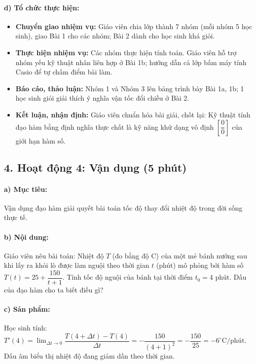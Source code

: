 \documentclass[12pt, a4paper]{article}
\begin{document}
\paragraph{d) Tổ chức thực hiện:}
\begin{itemize}[leftmargin=0.8cm]
    \item \textbf{Chuyển giao nhiệm vụ:} Giáo viên chia lớp thành 7 nhóm (mỗi nhóm 5 học sinh), giao Bài 1 cho các nhóm; Bài 2 dành cho học sinh khá giỏi.
    \item \textbf{Thực hiện nhiệm vụ:} Các nhóm thực hiện tính toán. Giáo viên hỗ trợ nhóm yếu kỹ thuật nhân liên hợp ở Bài 1b; hướng dẫn cả lớp bấm máy tính Casio để tự chấm điểm bài làm.
    \item \textbf{Báo cáo, thảo luận:} Nhóm 1 và Nhóm 3 lên bảng trình bày Bài 1a, 1b; 1 học sinh giỏi giải thích ý nghĩa vận tốc đổi chiều ở Bài 2.
    \item \textbf{Kết luận, nhận định:} Giáo viên chuẩn hóa bài giải, chốt lại: Kỹ thuật tính đạo hàm bằng định nghĩa thực chất là kỹ năng khử dạng vô định $\left[\dfrac{0}{0}\right]$ của giới hạn hàm số.
\end{itemize}

\subsection*{4. Hoạt động 4: Vận dụng (5 phút)}

\paragraph{a) Mục tiêu:} Vận dụng đạo hàm giải quyết bài toán tốc độ thay đổi nhiệt độ trong đời sống thực tế.

\paragraph{b) Nội dung:} Giáo viên nêu bài toán: Nhiệt độ $T$ (đo bằng độ C) của một mẻ bánh nướng sau khi lấy ra khỏi lò được làm nguội theo thời gian $t$ (phút) mô phỏng bởi hàm số $T(t) = 25 + \dfrac{150}{t + 1}$. Tính tốc độ nguội của bánh tại thời điểm $t_0 = 4\text{ phút}$. Dấu của đạo hàm cho ta biết điều gì?

\paragraph{c) Sản phẩm:} Học sinh tính: $T'(4) = \lim_{\Delta t \to 0} \dfrac{T(4 + \Delta t) - T(4)}{\Delta t} = -\dfrac{150}{(4 + 1)^2} = -\dfrac{150}{25} = -6^\circ\text{C/phút}$. Dấu âm biểu thị nhiệt độ đang giảm dần theo thời gian.
\end{document}
